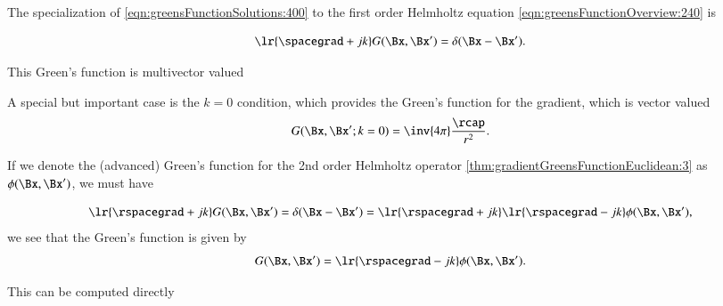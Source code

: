 %
%

The specialization of \cref{eqn:greensFunctionSolutions:400} to the first order Helmholtz equation \cref{eqn:greensFunctionOverview:240} is

\begin{dmath}\label{eqn:greensFunctionFirstOrderHelmholtz:700}
\lr{ \spacegrad + j k } G(\Bx, \Bx')  = \delta(\Bx - \Bx').
\end{dmath}

This Green's function is multivector valued


A special but important case is the \( k = 0 \) condition, which provides the
Green's function for the gradient, which is vector valued
\begin{equation}\label{eqn:greensFunctionFirstOrderHelmholtz:900}
G(\Bx, \Bx' ; k = 0) = \inv{4 \pi} \frac{\rcap}{r^2}.
\end{equation}

If we denote the (advanced) Green's function for the 2nd order Helmholtz operator
\cref{thm:gradientGreensFunctionEuclidean:3}
as \( \phi(\Bx, \Bx') \), we must have

\begin{equation}\label{eqn:greensFunctionFirstOrderHelmholtz:740}
\lr{ \rspacegrad + j k } G(\Bx, \Bx') = \delta(\Bx - \Bx') =
\lr{ \rspacegrad + j k } \lr{ \rspacegrad - j k } \phi(\Bx, \Bx'),
\end{equation}
we see that the Green's function is given by
\begin{dmath}\label{eqn:greensFunctionFirstOrderHelmholtz:760}
G(\Bx, \Bx')
=
\lr{ \rspacegrad - j k } \phi(\Bx, \Bx').
\end{dmath}

This can be computed directly

